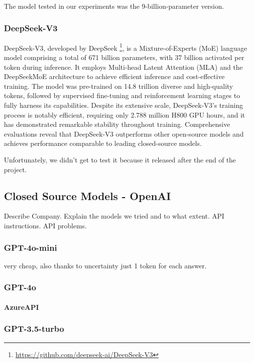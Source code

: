 The model tested in our experiments was the 9-billion-parameter version.
\subsubsection{DeepSeek-V3}
DeepSeek-V3, developed by DeepSeek \footnote{\url{https://github.com/deepseek-ai/DeepSeek-V3}},
is a Mixture-of-Experts (MoE) language model comprising a total of 671 billion
parameters, with 37 billion activated per token during inference. It employs
Multi-head Latent Attention (MLA) and the DeepSeekMoE architecture to achieve
efficient inference and cost-effective training. The model was pre-trained on 14.8
trillion diverse and high-quality tokens, followed by supervised fine-tuning and
reinforcement learning stages to fully harness its capabilities. Despite its extensive
scale, DeepSeek-V3's training process is notably efficient, requiring only 2.788
million H800 GPU hours, and it has demonstrated remarkable stability throughout
training. Comprehensive evaluations reveal that DeepSeek-V3 outperforms other open-source
models and achieves performance comparable to leading closed-source models.

Unfortunately, we didn't get to test it because it released after the end of the
project.

\subsection{Closed Source Models - OpenAI}
\label{sub:closed_source_models_openai}

Describe Company. Explain the models we tried and to what extent. API instructions.
API problems.

\subsubsection{GPT-4o-mini}
very cheap, also thanks to uncertainty just 1 token for each answer.
\subsubsection{GPT-4o}
\paragraph{AzureAPI}
\subsubsection{GPT-3.5-turbo}